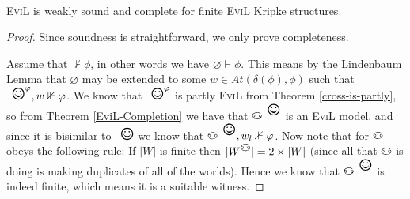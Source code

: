 \begin{theorem}\label{abst-finite-completeness}\ 
\begin{center}
\textsc{EviL} is weakly sound and complete for finite \textsc{EviL}
Kripke structures.
\end{center}
\end{theorem}
\begin{proof}
Since soundness is straightforward, we only prove completeness.

Assume that $\nvdash \phi$, in other words we have $\varnothing \vdash
\phi$.  This means by the Lindenbaum Lemma that $\varnothing$ may be
extended to some $w \in At(\delta(\phi),\phi)$ such that 
$\Cross^\phi,w\nVdash \phi$.  We know that $\Cross^\phi$ is partly
\textsc{EviL} from Theorem \ref{cross-is-partly}, so from Theorem
\ref{EviL-Completion} we have that $\invis^\Cross$ is an \textsc{EviL}
model, and since it is bisimilar to $\Cross$ we know that
$\invis^\Cross, w_l \nVdash \phi$.
Now note that for $\invis$ obeys the following rule:  If $|W|$ is
finite then $|W^\invis| = 2 \times |W|$ (since all that $\invis$ is
doing is making duplicates of all of the worlds).  Hence we know that
$\invis^\Cross$ is indeed finite, which means it is a suitable witness.
\end{proof}

